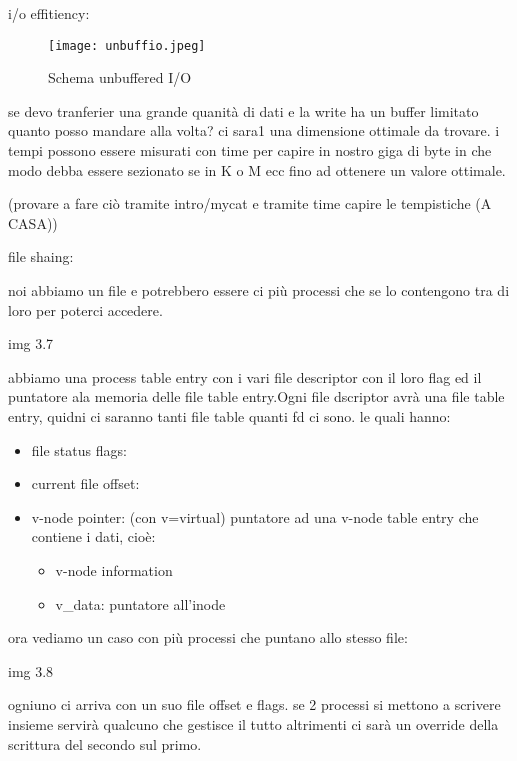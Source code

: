 i/o effitiency:

\begin{figure}[H]
\centering
\texttt{[image: unbuffio.jpeg]}
\caption{Schema unbuffered I/O} 
\label{unbuffio}
\end{figure}

se devo tranferier una grande quanità di dati e la write ha un buffer limitato quanto posso mandare alla volta? ci sara1 una dimensione ottimale da trovare. i tempi possono essere misurati con time per capire in nostro giga di byte in che modo debba essere sezionato se in K o M ecc fino ad ottenere un valore ottimale.

(provare a fare ciò tramite intro/mycat e tramite time capire le tempistiche (A CASA))








file shaing:

noi abbiamo un file e potrebbero essere ci più processi che se lo contengono tra di loro per poterci accedere.


img 3.7


abbiamo una process table entry con i vari file descriptor con il loro flag ed il puntatore ala memoria delle file table entry.Ogni file dscriptor avrà una file table entry, quidni ci saranno tanti file table quanti fd ci sono. le quali hanno:

\begin{itemize}
	\item file status flags: 
	\item current file offset: 
	\item v-node pointer: (con v=virtual) puntatore ad una v-node table entry che contiene i dati, cioè:
		\begin{itemize}
			\item v-node information
			\item v\_data: puntatore all'inode
		\end{itemize}
\end{itemize}


ora vediamo un caso con più processi che puntano allo stesso file:


img 3.8


ogniuno ci arriva con un suo file offset e flags. se 2 processi si mettono a scrivere insieme servirà qualcuno che gestisce il tutto altrimenti ci sarà un override della scrittura del secondo sul primo.







